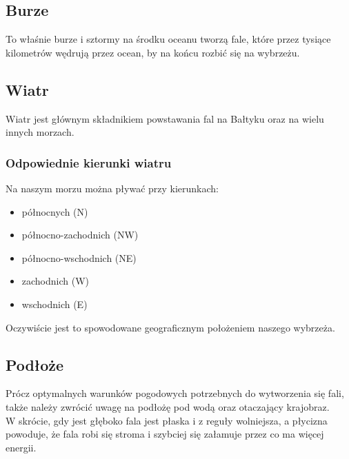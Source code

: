 \documentclass{article}
\begin{document}
\subsection{Burze}
To właśnie burze i sztormy na środku oceanu tworzą fale, które przez tysiące kilometrów wędrują przez ocean, by na końcu rozbić się na wybrzeżu.
\subsection{Wiatr}
Wiatr jest głównym składnikiem powstawania fal na Bałtyku oraz na wielu innych morzach.
\subsubsection{Odpowiednie kierunki wiatru}
Na naszym morzu można pływać  przy kierunkach:
	\begin{itemize}	
	\item północnych (N)
	\item północno-zachodnich (NW)
	\item północno-wschodnich (NE)
	\item zachodnich (W)
	\item wschodnich (E)
	\end{itemize}
Oczywiście jest to spowodowane geograficznym położeniem naszego wybrzeża.
\subsection{Podłoże}
Prócz optymalnych warunków pogodowych potrzebnych do wytworzenia się fali, także należy zwrócić uwagę na podłożę pod wodą oraz otaczający krajobraz.  \\
W skrócie, gdy jest głęboko fala jest płaska i z reguły wolniejsza, a płycizna powoduje, że fala robi się stroma i szybciej się załamuje przez co ma więcej energii.
\end{document}
